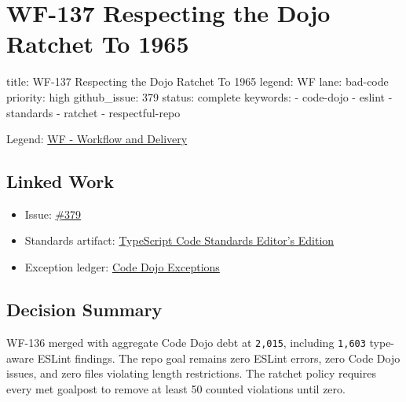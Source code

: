 \chapter{WF-137 Respecting the Dojo Ratchet To 1965}\label{record-219}

\smallskip

\begin{RecordMeta}
title: WF-137 Respecting the Dojo Ratchet To 1965
legend: WF
lane: bad-code
priority: high
github_issue: 379
status: complete
keywords:
  - code-dojo
  - eslint
  - standards
  - ratchet
  - respectful-repo

\end{RecordMeta}

Legend: \href{https://github.com/flyingrobots/bijou/blob/cbd70612140e7a450d764b3c7be1c6af878b99bc/docs/legends/WF-workflow-delivery.md}{WF - Workflow and Delivery}

\section{Linked Work}\label{record-219-linked-work}

\begin{itemize}
\tightlist
\item
  Issue: \href{https://github.com/flyingrobots/bijou/issues/379}{\#379}
\item
  Standards artifact: \href{https://github.com/flyingrobots/bijou/blob/cbd70612140e7a450d764b3c7be1c6af878b99bc/docs/typescript-code-standards.editors-edition.md}{TypeScript Code Standards Editor's Edition}
\item
  Exception ledger: \href{https://github.com/flyingrobots/bijou/blob/cbd70612140e7a450d764b3c7be1c6af878b99bc/docs/code-dojo-exceptions.md}{Code Dojo Exceptions}
\end{itemize}

\section{Decision Summary}\label{record-219-decision-summary}

WF-136 merged with aggregate Code Dojo debt at \texttt{2\allowbreak{},\allowbreak{}0\allowbreak{}1\allowbreak{}5}, including \texttt{1\allowbreak{},\allowbreak{}6\allowbreak{}0\allowbreak{}3} type-aware ESLint findings. The repo goal remains zero ESLint errors, zero Code Dojo issues, and zero files violating length restrictions. The ratchet policy requires every met goalpost to remove at least 50 counted violations until zero.

